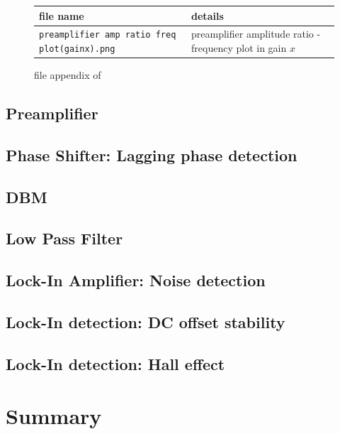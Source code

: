 \documentclass{article}
\begin{document}
\begin{figure}[H]
    \begin{tabular}{ | m{8cm} | m{5cm}|  } 
      file name& details \\ 
      \hline
        \verb|preamplifier amp ratio freq plot(gainx).png| & preamplifier amplitude ratio - frequency plot in gain $x$
    \end{tabular}
    \caption{file appendix of \cite{github}}
    \label{fig: file_appendix}
\end{figure}

\subsection{Preamplifier}

\subsection{Phase Shifter: Lagging phase detection}
\label{results: phase shifter}

\subsection{DBM}

\subsection{Low Pass Filter}
\label{results: low pass filter}

\subsection{Lock-In Amplifier: Noise detection}
\label{results: noise detection}


\subsection{Lock-In detection: DC offset stability}



\subsection{Lock-In detection: Hall effect}



\section{Summary}

\cite{abcd}


\end{document}
